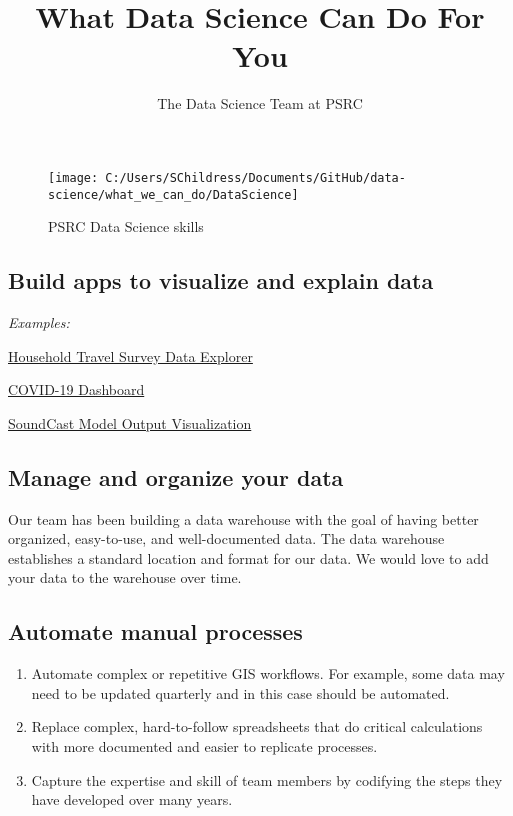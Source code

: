 \documentclass[
]{article}
\title{What Data Science Can Do For You}
\author{The Data Science Team at PSRC}
\date{}
\begin{document}
\maketitle

\begin{figure}
\texttt{[image: C:/Users/SChildress/Documents/GitHub/data-science/what\_we\_can\_do/DataScience]} \caption{PSRC Data Science skills}\label{fig:unnamed-chunk-1}
\end{figure}

\hypertarget{build-apps-to-visualize-and-explain-data}{%
\subsection{Build apps to visualize and explain
data}\label{build-apps-to-visualize-and-explain-data}}

\emph{Examples:}

\href{http://dataexplorer.psrc.org/household-travel-survey}{Household
Travel Survey Data Explorer}

\href{http://aws-linux:3838/covid19-dashboard/}{COVID-19 Dashboard}

\href{http://aws-linux/soundcast_dash}{SoundCast Model Output
Visualization}

\hypertarget{manage-and-organize-your-data}{%
\subsection{Manage and organize your
data}\label{manage-and-organize-your-data}}

Our team has been building a data warehouse with the goal of having
better organized, easy-to-use, and well-documented data. The data
warehouse establishes a standard location and format for our data. We
would love to add your data to the warehouse over time.

\hypertarget{automate-manual-processes}{%
\subsection{Automate manual processes}\label{automate-manual-processes}}

\begin{enumerate}
\def\labelenumi{\arabic{enumi}.}
\item
  Automate complex or repetitive GIS workflows. For example, some data
  may need to be updated quarterly and in this case should be automated.
\item
  Replace complex, hard-to-follow spreadsheets that do critical
  calculations with more documented and easier to replicate processes.
\item
  Capture the expertise and skill of team members by codifying the steps
  they have developed over many years.
\end{enumerate}
\end{document}
